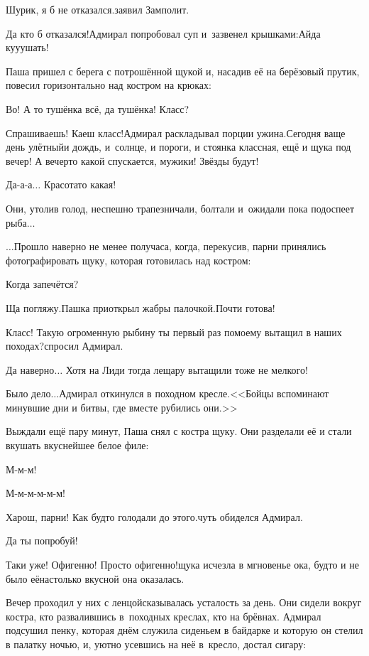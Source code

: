 \diagdash Шурик, я б не отказался.\mdash заявил Замполит.

\diagdash Да кто б отказался!\mdash Адмирал попробовал суп и~зазвенел крышками:\mdash Айда ку\sdash у\sdash ушать!

Паша пришел с берега с потрошённой щукой и, насадив её на берёзовый прутик, повесил горизонтально над костром на крюках:

\diagdash Во! А то тушёнка всё, да тушёнка! Класс?

\diagdash Спрашиваешь! Каеш класс!\mdash Адмирал раскладывал порции ужина.\mdash Сегодня ваще день улётный\mdash и дождь, и~солнце, и пороги, и стоянка классная, ещё и щука под вечер! А вечер\sdash то какой спускается, мужики! Звёзды будут!

\diagdash Да-а-а$\ldots$ Красота\sdash то какая!

Они, утолив голод, неспешно трапезничали, болтали и~ожидали пока подоспеет рыба$\ldots$

\vspace{0.5cm}
$\ldots$Прошло наверно не менее получаса, когда, перекусив, парни принялись фотографировать щуку, которая готовилась над костром:

\diagdash Когда запечётся?

\diagdash Ща погляжу.\mdash Пашка приоткрыл жабры палочкой.\mdash Почти готова!

\diagdash Класс! Такую огроменную рыбину ты первый раз по\sdash моему вытащил в наших походах?\mdash спросил Адмирал.

\diagdash Да наверно$\ldots$ Хотя на Лиди тогда лещару вытащили тоже не мелкого! 

\diagdash Было дело$\ldots$\mdash Адмирал откинулся в походном кресле.\mdash <<Бойцы вспоминают минувшие дни и битвы, где вместе рубились они.>>

Выждали ещё пару минут, Паша снял с костра щуку. Они разделали её и стали вкушать вкуснейшее белое филе:

\diagdash М-м-м!

\diagdash М-м-м-м-м-м!

\diagdash Харош, парни! Как будто голодали до этого.\mdash чуть обиделся Адмирал.

\diagdash Да ты попробуй!

\diagdash Таки уже! Офигенно! Просто офигенно!\mdash щука исчезла в мгновенье ока, будто и не было её\mdash настолько вкусной она оказалась.

Вечер проходил у них с ленцой\mdash сказывалась усталость за день. Они сидели вокруг костра, кто развалившись в~походных креслах, кто на брёвнах. Адмирал подсушил пенку, которая днём служила сиденьем в байдарке и которую он стелил в палатку ночью, и, уютно усевшись на неё в~кресло, достал сигару:

